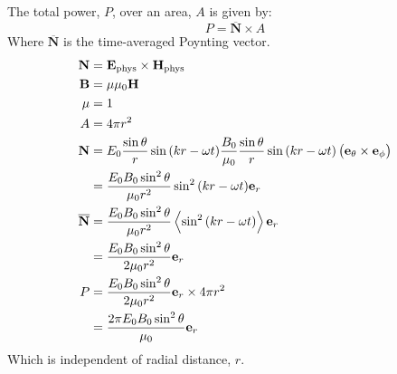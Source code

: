 \subsection{}
The total power, $ P $, over an area, $ A $ is given by:
\begin{equation*}
    P = \overline{\mathbf{N}} \times A
\end{equation*}
Where $ \overline{\mathbf{N}} $ is the time-averaged Poynting vector.
\begin{align*}
    \mathbf{N} & = \mathbf{E}_{\textrm{phys}} \times \mathbf{H}_{\textrm{phys}}\\
    \mathbf{B} & = \mu \mu_0 \mathbf{H}\\
    \mu & = 1\\
    A & = 4 \pi r^2 \\
    \mathbf{N} & = E_0 \frac{\sin{\theta}}{r} \sin{\del{kr - \omega t}}\frac{B_0}{\mu_0} \frac{\sin{\theta}}{r} \sin{\del{kr - \omega t}} \del{\mathbf{e}_{\theta} \times \mathbf{e}_{\phi}}\\
    & = \frac{E_0 B_0 \sin^2{\theta}}{\mu_0 r^2} \sin^2{\del{kr - \omega t}}\mathbf{e}_r\\
    \overline{\mathbf{N}} & = \frac{E_0 B_0 \sin^2{\theta}}{\mu_0 r^2} \expectationvalue{\sin^2{\del{kr - \omega t}}}\mathbf{e}_r\\
    & = \frac{E_0 B_0 \sin^2{\theta}}{2 \mu_0 r^2} \mathbf{e}_r\\
    P & = \frac{E_0 B_0 \sin^2{\theta}}{2 \mu_0 r^2} \mathbf{e}_r \times 4 \pi r^2\\
    & = \frac{2 \pi E_0 B_0 \sin^2{\theta}}{\mu_0}\mathbf{e}_r
\end{align*}
Which is independent of radial distance, $ r $.
